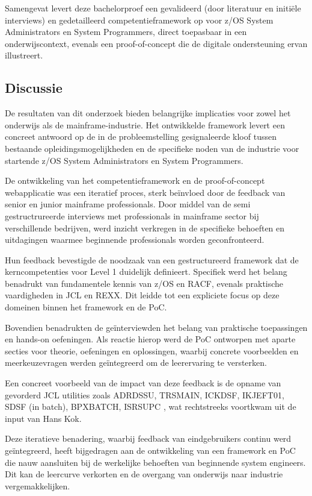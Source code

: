 Samengevat levert deze bachelorproef een gevalideerd (door literatuur en initiële interviews) en gedetailleerd competentieframework op voor  z/OS System Administrators en System Programmers, direct toepasbaar in een onderwijscontext, evenals een proof-of-concept die de digitale ondersteuning ervan illustreert.

\subsection{Discussie}

De resultaten van dit onderzoek bieden belangrijke implicaties voor zowel het onderwijs als de mainframe-industrie. Het ontwikkelde framework levert een concreet antwoord op de in de probleemstelling gesignaleerde kloof tussen bestaande opleidingsmogelijkheden en de specifieke noden van de industrie voor startende z/OS System Administrators en System Programmers.

De ontwikkeling van het competentieframework en de proof-of-concept webapplicatie was een iteratief proces, sterk beïnvloed door de feedback van senior en junior mainframe professionals. Door middel van de semi gestructrureerde interviews met professionals in mainframe sector bij verschillende bedrijven, werd inzicht verkregen in de specifieke behoeften en uitdagingen waarmee beginnende professionals worden geconfronteerd.

Hun feedback bevestigde de noodzaak van een gestructureerd framework dat de kerncompetenties voor Level 1 duidelijk definieert. Specifiek werd het belang benadrukt van fundamentele kennis van z/OS en RACF, evenals praktische vaardigheden in JCL en REXX. Dit leidde tot een expliciete focus op deze domeinen binnen het framework en de PoC.

Bovendien benadrukten de geïnterviewden het belang van praktische toepassingen en hands-on oefeningen. Als reactie hierop werd de PoC ontworpen met aparte secties voor theorie, oefeningen en oplossingen, waarbij concrete voorbeelden en meerkeuzevragen werden geïntegreerd om de leerervaring te versterken.

Een concreet voorbeeld van de impact van deze feedback is de opname van gevorderd JCL utilities zoals ADRDSSU, TRSMAIN, ICKDSF, IKJEFT01,
SDSF (in batch), BPXBATCH, ISRSUPC , wat rechtstreeks voortkwam uit de input van Hans Kok.

Deze iteratieve benadering, waarbij feedback van eindgebruikers continu werd geïntegreerd, heeft bijgedragen aan de ontwikkeling van een framework en PoC die nauw aansluiten bij de werkelijke behoeften van beginnende system engineers. Dit kan de leercurve verkorten en de overgang van onderwijs naar industrie vergemakkelijken.

